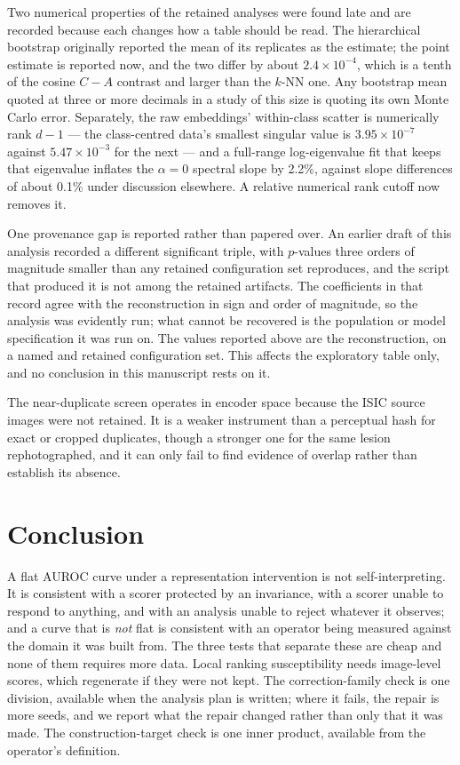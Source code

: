 \documentclass[pdflatex,sn-basic]{sn-jnl}
\theoremstyle{plain}
\theoremstyle{definition}
\theoremstyle{remark}
\begin{document}
Two numerical properties of the retained analyses were found late and are
recorded because each changes how a table should be read. The hierarchical
bootstrap originally reported the mean of its replicates as the estimate; the
point estimate is reported now, and the two differ by about $2.4\times10^{-4}$,
which is a tenth of the cosine $C-A$ contrast and larger than the $k$-NN one.
Any bootstrap mean quoted at three or more decimals in a study of this size is
quoting its own Monte Carlo error. Separately, the raw embeddings' within-class
scatter is numerically rank $d-1$ --- the class-centred data's smallest singular
value is $3.95\times10^{-7}$ against $5.47\times10^{-3}$ for the next --- and a
full-range log-eigenvalue fit that keeps that eigenvalue inflates the
$\alpha=0$ spectral slope by 2.2\%, against slope differences of about 0.1\%
under discussion elsewhere. A relative numerical rank cutoff now removes it.

One provenance gap is reported rather than papered over. An earlier draft of this analysis recorded a different significant triple, with $p$-values three orders of magnitude smaller than any retained configuration set reproduces, and the script that produced it is not among the retained artifacts. The coefficients in that record agree with the reconstruction in sign and order of magnitude, so the analysis was evidently run; what cannot be recovered is the population or model specification it was run on. The values reported above are the reconstruction, on a named and retained configuration set. This affects the exploratory table only, and no conclusion in this manuscript rests on it.

The near-duplicate screen operates in encoder space because the ISIC source images were not retained. It is a weaker instrument than a perceptual hash for exact or cropped duplicates, though a stronger one for the same lesion rephotographed, and it can only fail to find evidence of overlap rather than establish its absence.

\section{Conclusion}
A flat AUROC curve under a representation intervention is not self-interpreting.
It is consistent with a scorer protected by an invariance, with a scorer unable
to respond to anything, and with an analysis unable to reject whatever it
observes; and a curve that is \emph{not} flat is consistent with an operator
being measured against the domain it was built from. The three tests that
separate these are cheap and none of them requires more data. Local ranking
susceptibility needs image-level scores, which regenerate if they were not
kept. The correction-family check is one division, available when the analysis
plan is written; where it fails, the repair is more seeds, and we report what
the repair changed rather than only that it was made. The construction-target check is one inner product, available
from the operator's definition.
\end{document}
